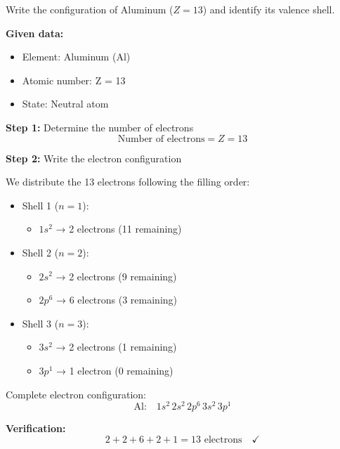 \begin{exercise}
    Write the configuration of Aluminum (\( Z = 13 \)) and identify its valence shell.
    \begin{solu}
        \textbf{Given data:}
        \begin{itemize}
            \item Element: Aluminum (Al)
            \item Atomic number: Z = 13
            \item State: Neutral atom
        \end{itemize}

        \textbf{Step 1:} Determine the number of electrons
        \[
            \text{Number of electrons} = Z = 13
        \]

        \textbf{Step 2:} Write the electron configuration

        We distribute the 13 electrons following the filling order:
        \begin{itemize}
            \item Shell 1 (\(n = 1\)):
            \begin{itemize}
                \item \(1s^2\) → 2 electrons (11 remaining)
            \end{itemize}
            \item Shell 2 (\(n = 2\)):
            \begin{itemize}
                \item \(2s^2\) → 2 electrons (9 remaining)
                \item \(2p^6\) → 6 electrons (3 remaining)
            \end{itemize}
            \item Shell 3 (\(n = 3\)):
            \begin{itemize}
                \item \(3s^2\) → 2 electrons (1 remaining)
                \item \(3p^1\) → 1 electron (0 remaining)
            \end{itemize}
        \end{itemize}

        Complete electron configuration:
        \[
            \text{Al:} \quad 1s^2 \, 2s^2 \, 2p^6 \, 3s^2 \, 3p^1
        \]

        \textbf{Verification:}
        \[
            2 + 2 + 6 + 2 + 1 = 13 \text{ electrons} \quad \checkmark
        \]


\end{solu}
\end{exercise}
